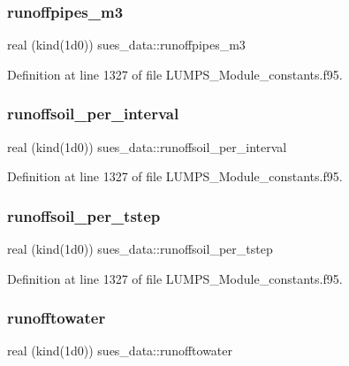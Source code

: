 \subsubsection{\texorpdfstring{runoffpipes\+\_\+m3}{runoffpipes\_m3}}
{\footnotesize\ttfamily real (kind(1d0)) sues\+\_\+data\+::runoffpipes\+\_\+m3}



Definition at line 1327 of file L\+U\+M\+P\+S\+\_\+\+Module\+\_\+constants.\+f95.

\mbox{\label{namespacesues__data_ae3658e6cd4c5115a1a9f8ea57cf6f6b1}} 
\subsubsection{\texorpdfstring{runoffsoil\+\_\+per\+\_\+interval}{runoffsoil\_per\_interval}}
{\footnotesize\ttfamily real (kind(1d0)) sues\+\_\+data\+::runoffsoil\+\_\+per\+\_\+interval}



Definition at line 1327 of file L\+U\+M\+P\+S\+\_\+\+Module\+\_\+constants.\+f95.

\mbox{\label{namespacesues__data_a3b42551207483efdea0f50bba253afe4}} 
\subsubsection{\texorpdfstring{runoffsoil\+\_\+per\+\_\+tstep}{runoffsoil\_per\_tstep}}
{\footnotesize\ttfamily real (kind(1d0)) sues\+\_\+data\+::runoffsoil\+\_\+per\+\_\+tstep}



Definition at line 1327 of file L\+U\+M\+P\+S\+\_\+\+Module\+\_\+constants.\+f95.

\mbox{\label{namespacesues__data_a92f648948ca3627c9bc8442568c4bba1}} 
\subsubsection{\texorpdfstring{runofftowater}{runofftowater}}
{\footnotesize\ttfamily real (kind(1d0)) sues\+\_\+data\+::runofftowater}



